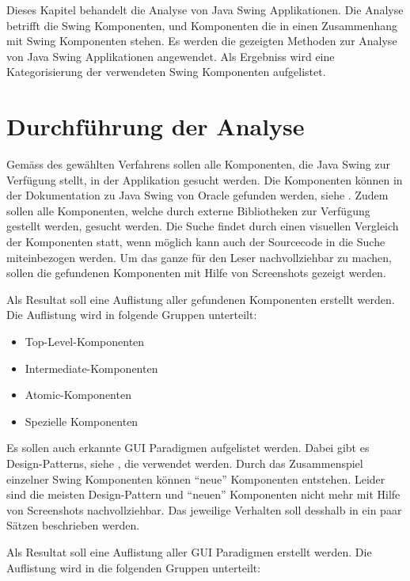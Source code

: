   Dieses Kapitel behandelt die Analyse von Java Swing Applikationen. Die
  Analyse betrifft die Swing Komponenten, und Komponenten die in einen
  Zusammenhang mit Swing Komponenten stehen. Es werden die gezeigten
  Methoden zur Analyse von Java Swing Applikationen angewendet. Als Ergebniss
  wird eine Kategorisierung der verwendeten Swing Komponenten aufgelistet.
  
  \section{Durchführung der Analyse}
  
  Gemäss des gewählten Verfahrens sollen alle Komponenten, die Java Swing zur
  Verfügung stellt, in der Applikation gesucht werden. Die Komponenten können in
  der Dokumentation zu Java Swing von Oracle gefunden werden, siehe
  \cite{SwingComponentsByOracle}. Zudem sollen alle Komponenten, welche durch
  externe Bibliotheken zur Verfügung gestellt werden, gesucht werden. Die Suche
  findet durch einen visuellen Vergleich der Komponenten statt, wenn möglich
  kann auch der Sourcecode in die Suche miteinbezogen werden. Um das ganze für
  den Leser nachvollziehbar zu machen, sollen die gefundenen Komponenten mit
  Hilfe von Screenshots gezeigt werden.
  
  Als Resultat soll eine Auflistung aller gefundenen Komponenten erstellt
  werden. Die Auflistung wird in folgende Gruppen unterteilt:
  
  \begin{itemize}
    \item Top-Level-Komponenten
    \item Intermediate-Komponenten
    \item Atomic-Komponenten
    \item Spezielle Komponenten
  \end{itemize}
  
  \noindent
  Es sollen auch erkannte GUI Paradigmen aufgelistet werden. Dabei gibt es 
  Design-Patterns, siehe \cite{DesignPattern}, die verwendet werden. Durch das
  Zusammenspiel einzelner Swing Komponenten können ``neue'' Komponenten
  entstehen. Leider sind die meisten Design-Pattern und ``neuen'' Komponenten
  nicht mehr mit Hilfe von Screenshots nachvollziehbar. Das jeweilige Verhalten
  soll desshalb in ein paar Sätzen beschrieben werden.
  
  Als Resultat soll eine Auflistung aller GUI Paradigmen erstellt werden. Die
  Auflistung wird in die folgenden Gruppen unterteilt:
  
